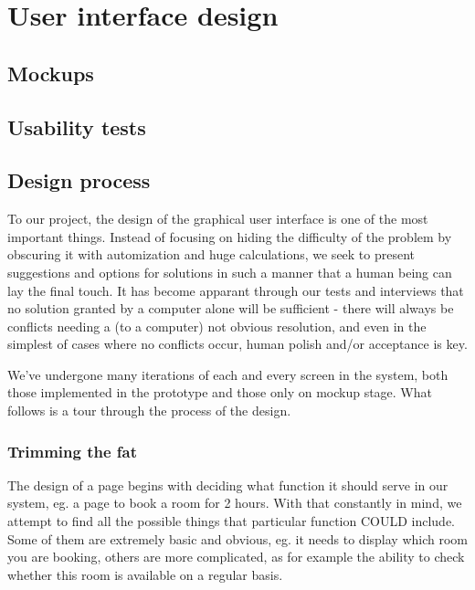 \chapter{User interface design}
\label{chap:user_interface_design}

\section{Mockups} %
\label{sec:mockups}


\section{Usability tests} %
\label{sec:usability_tests}



\section{Design process}
\label{sec:design_process}
To our project, the design of the graphical user interface is one of the most important things. Instead of focusing on hiding the difficulty of the problem by obscuring it with automization and huge calculations, we seek to present suggestions and options for solutions in such a manner that a human being can lay the final touch. It has become apparant through our tests and interviews that no solution granted by a computer alone will be sufficient - there will always be conflicts needing a (to a computer) not obvious resolution, and even in the simplest of cases where no conflicts occur, human polish and/or acceptance is key.

We've undergone many iterations of each and every screen in the system, both those implemented in the prototype and those only on mockup stage. What follows is a tour through the process of the design.



\subsection{Trimming the fat}
The design of a page begins with deciding what function it should serve in our system, eg. a page to book a room for 2 hours. With that constantly in mind, we attempt to find all the possible things that particular function COULD include. Some of them are extremely basic and obvious, eg. it needs to display which room you are booking, others are more complicated, as for example the ability to check whether this room is available on a regular basis.

